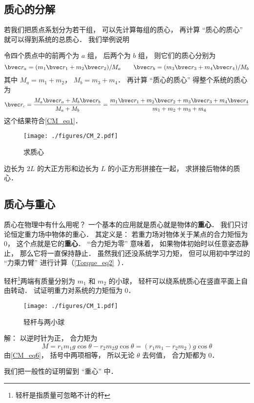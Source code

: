 \subsection{质心的分解}
若我们把质点系划分为若干组， 可以先计算每组的质心， 再计算 “质心的质心” 就可以得到系统的总质心． 我们举例说明
\begin{example}{}
令四个质点中的前两个为 $a$ 组， 后两个为 $b$ 组， 则它们的质心分别为
\begin{equation}
\bvec r_a = (m_1 \bvec r_1 + m_2 \bvec r_2)/M_a
\qquad
\bvec r_b = (m_3 \bvec r_3 + m_4 \bvec r_4)/M_b
\end{equation}
其中 $M_a = m_1 + m_2$， $M_b = m_3 + m_4$． 再计算 “质心的质心” 得整个系统的质心为
\begin{equation}
\bvec r_c = \frac{M_a \bvec r_a + M_b \bvec r_b}{M_a + M_b} = \frac{m_1 \bvec r_1 + m_2 \bvec r_2 + m_3 \bvec r_3 + m_4 \bvec r_4}{m_1 + m_2 + m_3 + m_4}
\end{equation}
这个结果符合\autoref{CM_eq1}．
\end{example}

\begin{exercise}{}
\begin{figure}[ht]
\centering
\texttt{[image: ./figures/CM\_2.pdf]}
\caption{求质心} \label{CM_fig2}
\end{figure}
边长为 $2L$ 的大正方形和边长为 $L$ 的小正方形拼接在一起， 求拼接后物体的质心．
\end{exercise}

\subsection{质心与重心}
质心在物理中有什么用呢？ 一个基本的应用就是质心就是物体的\textbf{重心}． 我们只讨论恒定重力场中物体的重心． 其定义是： 若重力场对物体关于某点的合力矩恒为 0， 这个点就是它的\textbf{重心}． “合力矩为零” 意味着， 如果物体初始时以任意姿态静止， 那么它将一直保持静止． 虽然我们还没系统学习力矩， 但可以用初中学过的 “力乘力臂” 进行计算（\autoref{Torque_eq2}~）．

\begin{example}{}\label{CM_ex1}
轻杆\footnote{轻杆是指质量可忽略不计的杆}两端有质量分别为 $m_1$ 和 $m_2$ 的小球， 轻杆可以绕系统质心在竖直平面上自由转动． 试证明重力对系统的力矩恒为 0．

\begin{figure}[ht]
\centering
\texttt{[image: ./figures/CM\_1.pdf]}
\caption{轻杆与两小球} \label{CM_fig1}
\end{figure}

解： 以逆时针为正， 合力矩为
\begin{equation}
M = r_1 m_1 g \cos\theta - r_2 m_2 g \cos\theta = (r_1 m_1 - r_2 m_2) g \cos\theta
\end{equation}
由\autoref{CM_eq6}， 括号中两项相等， 所以无论 $\theta$ 去何值， 合力矩都为 0．
\end{example}
我们把一般性的证明留到 “重心” 中．

